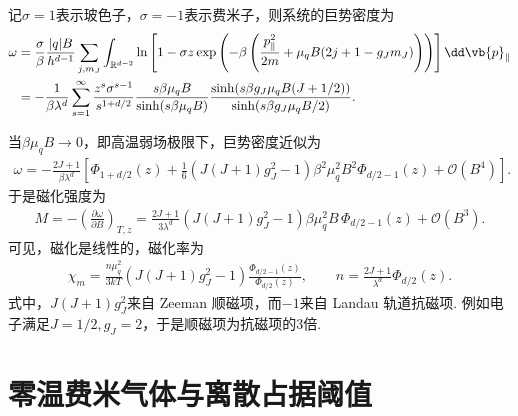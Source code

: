 记\(\sigma=1\)表示玻色子，\(\sigma=-1\)表示费米子，则系统的巨势密度为
\begin{align*}
	\omega
	&=
	\frac{\sigma}{\beta}
	\frac{|q|B}{h^{d-1}}
	\sum_{j,m_{J}}
	\int_{\mathbb{R}^{d-2}}
	\ln\left[
	1-\sigma z
	\exp\left(
	-\beta\left(
	\frac{p_{\parallel}^{2}}{2m}
	+\mu_{q}B(2j+1-g_{J}m_{J})
	\right)
	\right)
	\right]\dd\vb{p}_{\parallel}\\
	&=
	-\frac{1}{\beta\lambda^{d}}
	\sum_{s=1}^{\infty}
	\frac{z^{s}\sigma^{s-1}}{s^{1+d/2}}
	\frac{s\beta\mu_{q}B}{\sinh(s\beta\mu_{q}B)}
	\frac{
		\sinh\!\left(s\beta g_{J}\mu_{q}B(J+1/2)\right)
	}{
		\sinh\!\left(s\beta g_{J}\mu_{q}B/2\right)
	}.
\end{align*}

当\(\beta\mu_q B\to0\)，即高温弱场极限下，巨势密度近似为
\begin{align*}
	\omega
	=
	-\frac{2J+1}{\beta\lambda^{d}}
	\left[
		\Phi_{1+d/2}(z)
		+
		\frac{1}{6}
		\left(J(J+1)g_{J}^{2}-1\right)
		\beta^{2}\mu_{q}^{2}B^{2}
		\Phi_{d/2-1}(z)
		+\mathcal{O}(B^{4})
	\right].
\end{align*}
于是磁化强度为
\begin{align*}
	M
	=
	-\left(\frac{\partial\omega}{\partial B}\right)_{T,z}
	=
	\frac{2J+1}{3\lambda^{d}}
	\left(J(J+1)g_{J}^{2}-1\right)
	\beta\mu_{q}^{2}B\,\Phi_{d/2-1}(z)
	+\mathcal{O}(B^{3}).
\end{align*}
可见，磁化是线性的，磁化率为
\begin{align*}
	\chi_{m}
	=
	\frac{n\mu_{q}^{2}}{3kT}
	\left(J(J+1)g_{J}^{2}-1\right)
	\frac{\Phi_{d/2-1}(z)}{\Phi_{d/2}(z)},
	\qquad
	n=\frac{2J+1}{\lambda^{d}}\Phi_{d/2}(z).
\end{align*}
式中，\(J(J+1)g_{J}^{2}\)来自 Zeeman 顺磁项，而\(-1\)来自 Landau 轨道抗磁项. 例如电子满足\(J=1/2,g_{J}=2\)，于是顺磁项为抗磁项的3倍.

\section{零温费米气体与离散占据阈值}

